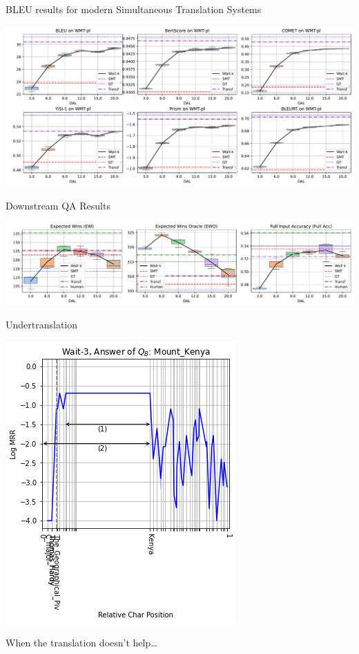 \documentclass[compress]{beamer}
\begin{document}
\begin{frame}{BLEU results for modern Simultaneous Translation Systems}

  \begin{center}
  \includegraphics[width=0.9\linewidth]{simtrans/simQA/bleu_simqa}
\end{center}

\end{frame}

\begin{frame}{Downstream QA Results}

  \begin{center}
  \includegraphics[width=0.8\linewidth]{simtrans/simQA/qametrics_simqa}
\end{center}


\end{frame}


\begin{frame}{Undertranslation}
  \begin{center}
    \includegraphics[width=0.4\paperwidth]{simtrans/simQA/ex_undertranslation}
  \end{center}
When the translation doesn't
help\dots
\end{frame}
\end{document}
